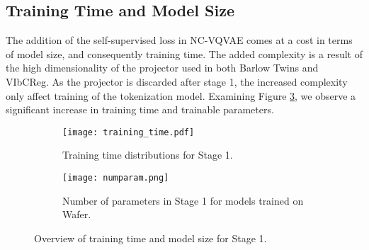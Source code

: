 \documentclass[../../thesis.tex]{subfiles}
\begin{document}
\subsection*{Training Time and Model Size}
The addition of the self-supervised loss in NC-VQVAE comes at a cost in terms of model size, and consequently training time. The added complexity is a result of the high dimensionality of the projector used in both Barlow Twins and VIbCReg. As the projector is discarded after stage 1, the increased complexity only affect training of the tokenization model. Examining Figure \ref{fig:comp}, we observe a significant increase in training time and trainable parameters.
\begin{figure}[h]
    \centering
    \begin{subfigure}[b]{0.4\textwidth}
        \texttt{[image: training\_time.pdf]}
        \caption{Training time distributions for Stage 1.}
        \label{fig:l}
    \end{subfigure}
    \hspace{0.05\textwidth} %
    \begin{subfigure}[b]{0.4\textwidth}
        \texttt{[image: numparam.png]}
        \caption{Number of parameters in Stage 1 for models trained on Wafer.}
        \label{fig:parm}
    \end{subfigure}
    \caption{Overview of training time and model size for Stage 1.}
    \label{fig:comp}
\end{figure}
\end{document}
